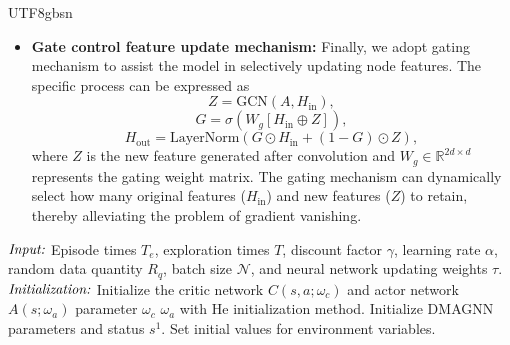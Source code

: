\documentclass[lettersize,journal]{IEEEtran}
\begin{document}
\begin{CJK}{UTF8}{gbsn}
\begin{itemize}
\item{\bf{Gate control feature update mechanism:}}
Finally, we adopt gating mechanism to assist the model in selectively updating node features. The specific process can be expressed as
\begin{equation}\label{eq-42}Z=\text{GCN}\left ( A,H_{\text{in}} \right ), \end{equation}
\begin{equation}\label{eq-43}G=\sigma \left ( W_g\left [ H_{\text{in}}  \oplus Z \right ]  \right ),\end{equation}
\begin{equation}\label{eq-44}H_{\text{out}}=\text{LayerNorm}\left ( G\odot H_{\text{in}}+\left ( 1-G \right ) \odot Z \right ), \end{equation}
where $Z$ is the new feature generated after convolution and $W_g\in \mathbb{R}^{2d\times d}$ represents the gating weight matrix. The gating mechanism can dynamically select how many original features ($H_{\text{in}}$) and new features ($Z$) to retain, thereby alleviating the problem of gradient vanishing.
\end{itemize}

\begin{algorithm}[t]
    \renewcommand{\algorithmicrequire}{\textbf{Input:}}
    \renewcommand{\algorithmicensure}{\textbf{Output:}}
    \caption{DMAGNN-AC Power Allocation Algorithm}
    \label{DDPG}
    \begin{algorithmic}[1]
    			\State $\emph{Input:}$ Episode times $T_e$, exploration times $T$, discount factor $\gamma$, learning rate $\alpha$, random data quantity $R_q$, batch size $\mathcal{N}$, and neural network updating weights $\tau$. %
    			\State $\emph{Initialization:}$ Initialize the critic network $C(s,a;\omega _c)$ and actor network $A(s;\omega _a)$ parameter $\omega _c$ $\omega _a$ with He\footnotemark[1]{} initialization method. Initialize DMAGNN parameters and status $s^1$.
        		\State Set initial values for environment variables.
        		

\end{algorithmic}
\end{algorithm}
\end{CJK}
\end{document}
